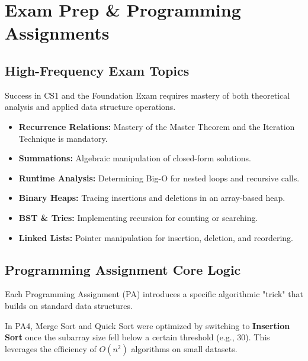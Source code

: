 \chapter{Exam Prep \& Programming Assignments}

\section{High-Frequency Exam Topics}

Success in CS1 and the Foundation Exam requires mastery of both theoretical analysis and applied data structure operations.

\begin{theorem}
    \begin{itemize}
        \item \textbf{Recurrence Relations:} Mastery of the Master Theorem and the Iteration Technique is mandatory.
        \item \textbf{Summations:} Algebraic manipulation of closed-form solutions.
        \item \textbf{Runtime Analysis:} Determining Big-O for nested loops and recursive calls.
    \end{itemize}
\end{theorem}

\begin{definition}
    \begin{itemize}
        \item \textbf{Binary Heaps:} Tracing insertions and deletions in an array-based heap.
        \item \textbf{BST \& Tries:} Implementing recursion for counting or searching.
        \item \textbf{Linked Lists:} Pointer manipulation for insertion, deletion, and reordering.
    \end{itemize}
\end{definition}

\section{Programming Assignment Core Logic}

Each Programming Assignment (PA) introduces a specific algorithmic "trick" that builds on standard data structures.

\begin{example}
    In PA4, Merge Sort and Quick Sort were optimized by switching to \textbf{Insertion Sort} once the subarray size fell below a certain threshold (e.g., 30). This leverages the efficiency of $O(n^2)$ algorithms on small datasets.
\end{example}

